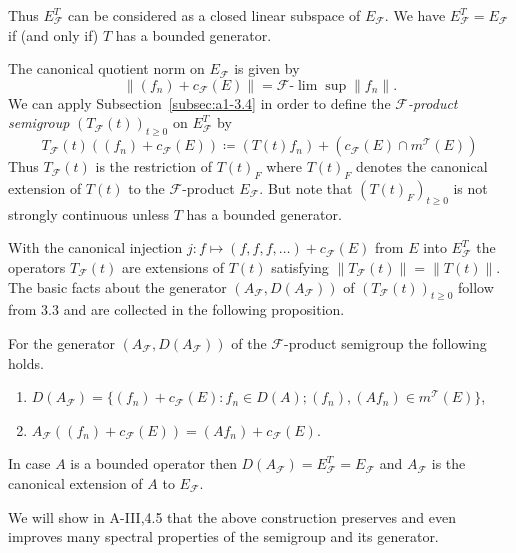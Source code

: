 Thus $E_{\mathcal{F}}^{T}$ can be considered as a closed linear subspace of $E_{\mathcal{F}}$. 
We have $E_{\mathcal{F}}^{T} = E_{\mathcal{F}}$ if (and only if) $T$ has a bounded generator.

The canonical quotient norm on $E_{\mathcal{F}}$ is given by
\[
    \|(f_{n}) + c_{\mathcal{F}}(E)\| = \mathcal{F}\text{-}\lim \sup \|f_{n}\| .
\]
We can apply Subsection~\ref{subsec:a1-3.4} in order to define the \emph{$\mathcal{F}$-product semigroup} $(T_{\mathcal{F}}(t))_{t \geq 0}$ on $E_{\mathcal{F}}^{T}$ by
\[
    T_{\mathcal{F}}(t)((f_{n}) + c_{\mathcal{F}}(E)) \coloneqq (T(t)f_{n}) 
    	+ ( c_{\mathcal{F}}(E)\cap m^{\mathcal{T}}(E) )
\]
Thus $T_{\mathcal{F}}(t)$ is the restriction of $T(t)_{F}$ where $T(t)_{F}$ denotes the canonical extension of $T(t)$ to the $\mathcal{F}$-product $E_{\mathcal{F}}$. 
But note that $(T(t)_{F})_{t \geq 0}$ is not strongly continuous unless $T$ has a bounded generator.

With the canonical injection $j \colon f \mapsto (f,f,f,\ldots) + c_{\mathcal{F}}(E)$ from $E$ into $E_{\mathcal{F}}^{T}$ the operators $T_{\mathcal{F}}(t)$ are extensions of $T(t)$ satisfying $\|T_{\mathcal{F}}(t)\| = \|T(t)\|$. The basic facts about the generator $(A_{\mathcal{F}},D(A_{\mathcal{F}}))$ of $(T_{\mathcal{F}}(t))_{t \geq 0}$ follow from 3.3 and are collected in the following proposition.
\begin{proposition*}\label{prop:a1-3.6}
For the generator $(A_{\mathcal{F}},D(A_{\mathcal{F}}))$ of the $\mathcal{F}$-product semigroup the following holds.
\begin{enumerate}[\upshape(i)]
\item 
$D(A_{\mathcal{F}}) = \{(f_{n}) + c_{\mathcal{F}}(E) \colon f_{n} \in D(A); (f_{n}), (Af_{n}) \in m^{\mathcal{T}}(E)\}$,

\item 
$A_{\mathcal{F}}((f_{n}) + c_{\mathcal{F}}(E)) = (Af_{n}) + c_{\mathcal{F}}(E)$.

\end{enumerate}
\end{proposition*}
In case $A$ is a bounded operator then $D(A_{\mathcal{F}}) = E_{\mathcal{F}}^{T} = E_{\mathcal{F}}$ and $A_{\mathcal{F}}$ is the canonical extension of $A$ to $E_{\mathcal{F}}$.

We will show in A-III,4.5 that the above construction preserves and even improves many spectral properties of the semigroup and its generator.

